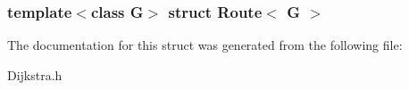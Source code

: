 \subsubsection*{template$<$class \-G$>$ struct Route$<$ G $>$}



\-The documentation for this struct was generated from the following file\-:\begin{DoxyCompactItemize}
\item 
\-Dijkstra.\-h\end{DoxyCompactItemize}
